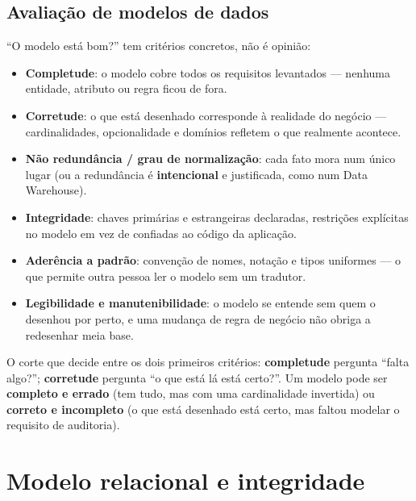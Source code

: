 \subsection{Avaliação de modelos de dados}

\begin{conceito}
“O modelo está bom?” tem critérios concretos, não é opinião:

\begin{itemize}
\item \textbf{Completude}: o modelo cobre todos os requisitos levantados
--- nenhuma entidade, atributo ou regra ficou de fora.
\item \textbf{Corretude}: o que está desenhado corresponde à realidade do
negócio --- cardinalidades, opcionalidade e domínios refletem o que
realmente acontece.
\item \textbf{Não redundância / grau de normalização}: cada fato mora num
único lugar (ou a redundância é \textbf{intencional} e justificada, como
num Data Warehouse).
\item \textbf{Integridade}: chaves primárias e estrangeiras declaradas,
restrições explícitas no modelo em vez de confiadas ao código da
aplicação.
\item \textbf{Aderência a padrão}: convenção de nomes, notação e tipos
uniformes --- o que permite outra pessoa ler o modelo sem um tradutor.
\item \textbf{Legibilidade e manutenibilidade}: o modelo se entende sem
quem o desenhou por perto, e uma mudança de regra de negócio não obriga a
redesenhar meia base.
\end{itemize}

O corte que decide entre os dois primeiros critérios: \textbf{completude}
pergunta “falta algo?”; \textbf{corretude} pergunta “o que está lá está
certo?”. Um modelo pode ser \textbf{completo e errado} (tem tudo, mas com
uma cardinalidade invertida) ou \textbf{correto e incompleto} (o que está
desenhado está certo, mas faltou modelar o requisito de auditoria).
\end{conceito}

\section{Modelo relacional e integridade}

